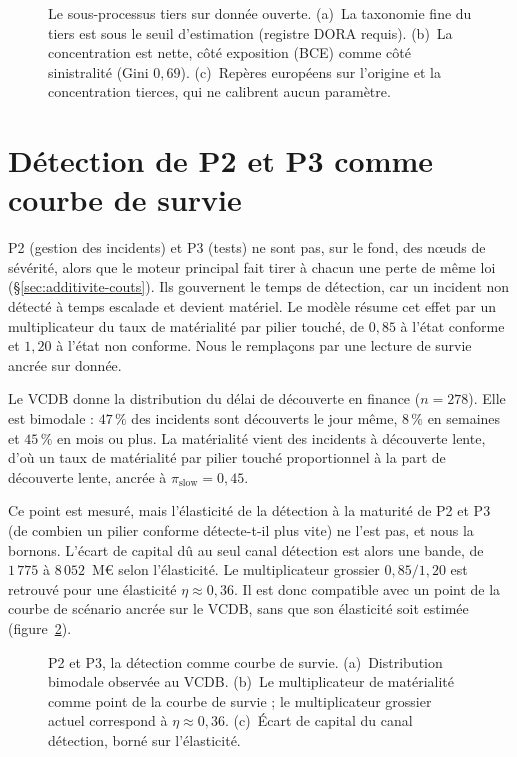 \begin{figure}[H]\centering
{}
\caption{Le sous-processus tiers sur donnée ouverte. (a)~La taxonomie fine du tiers est sous le
seuil d'estimation (registre DORA requis). (b)~La concentration est nette, côté exposition (BCE)
comme côté sinistralité (Gini $0{,}69$). (c)~Repères européens sur l'origine et la concentration tierces, qui ne calibrent aucun paramètre.}
\label{fig:p4-open}
\end{figure}

\section{Détection de P2 et P3 comme courbe de survie}
\label{sec:detection}

P2 (gestion des incidents) et P3 (tests) ne sont pas, sur le fond, des n\oe{}uds de sévérité, alors que le moteur
principal fait tirer à chacun une perte de même loi (\S\ref{sec:additivite-couts}). Ils gouvernent le
temps de détection, car un incident non détecté à temps escalade et devient matériel. Le modèle
résume cet effet par un multiplicateur du taux de matérialité par pilier touché, de $0{,}85$ à l'état conforme et
$1{,}20$ à l'état non conforme. Nous le remplaçons par une lecture de survie ancrée sur donnée.

Le VCDB donne la distribution du délai de découverte en finance ($n=278$). Elle est bimodale :
$47\,\%$ des incidents sont découverts le jour même, $8\,\%$ en semaines et $45\,\%$ en mois ou plus.
La matérialité vient des incidents à découverte lente, d'où un taux de matérialité par pilier touché proportionnel à
la part de découverte lente, ancrée à $\pi_{\text{slow}}=0{,}45$.

Ce point est mesuré, mais l'élasticité de la détection à la maturité de P2 et P3 (de combien un
pilier conforme détecte-t-il plus vite) ne l'est pas, et nous la bornons. L'écart de capital dû au seul canal
détection est alors une bande, de $1\,775$ à $8\,052$~M\euro{} selon l'élasticité. Le multiplicateur
grossier $0{,}85/1{,}20$ est retrouvé pour une élasticité $\eta\approx 0{,}36$. Il est donc compatible avec un point de la
courbe de scénario ancrée sur le VCDB, sans que son élasticité soit estimée (figure~\ref{fig:detection}).

\begin{figure}[H]\centering
{}
\caption{P2 et P3, la détection comme courbe de survie. (a)~Distribution bimodale observée au VCDB.
(b)~Le multiplicateur de matérialité comme point de la courbe de survie ; le multiplicateur grossier
actuel correspond à $\eta\approx0{,}36$. (c)~Écart de capital du canal détection, borné sur l'élasticité.}
\label{fig:detection}
\end{figure}

